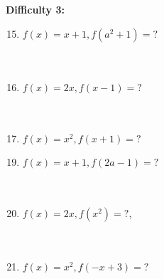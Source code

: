 \documentclass{article}
\begin{document}
\vspace{10cm}
\noindent
\textbf{Difficulty 3:}
\\
\begin{minipage}[t]{0.45\textwidth}
    \begin{enumerate}
        \setcounter{enumi}{14}
        \item $f(x) = x+1, f(a^2+1)=?$
        \\\\\\
        \item $f(x)= 2x, f(x-1)=?$ 
        \\\\\\
        \item $f(x)=x^2, f(x+1)=?$

    \end{enumerate}
\end{minipage}%
\hfill
\begin{minipage}[t]{0.45\textwidth}
    \begin{enumerate}
        \setcounter{enumi}{18} %
        \item $f(x) = x+1, f(2a-1)=?$
        \\\\\\
        \item $f(x)= 2x, f(x^2)=?$, 
        \\\\\\
        \item $f(x)=x^2, f(-x+3)=?$

    \end{enumerate}
\end{minipage}
\end{document}
